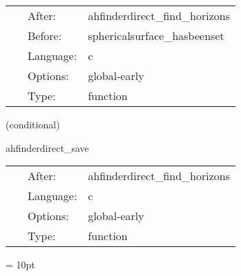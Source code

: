 \hspace{5mm}

 \begin{tabular*}{160mm}{cll} 
~ & After:  & ahfinderdirect\_find\_horizons \\ 
~ & Before:  & sphericalsurface\_hasbeenset \\ 
~ & Language:  & c \\ 
~ & Options:  & global-early \\ 
~ & Type:  & function \\ 
\end{tabular*} 


\vspace{5mm}

   (conditional) 

\hspace{5mm} ahfinderdirect\_save 

\hspace{5mm}{\it save apparent horizon(s) into cactus variables } 


\hspace{5mm}

 \begin{tabular*}{160mm}{cll} 
~ & After:  & ahfinderdirect\_find\_horizons \\ 
~ & Language:  & c \\ 
~ & Options:  & global-early \\ 
~ & Type:  & function \\ 
\end{tabular*} 



\vspace{5mm}\parskip = 10pt 
